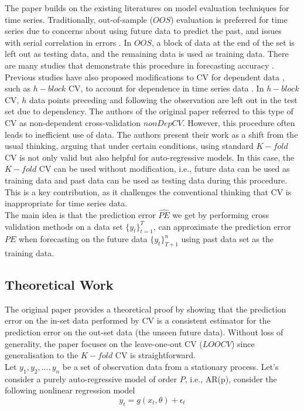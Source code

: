 \documentclass[12pt, oneside]{amsart}
\theoremstyle{definition}
\theoremstyle{remark}
\numberwithin{equation}{section}
\begin{document}
The paper builds on the existing literatures on model evaluation techniques for time series. Traditionally, out-of-sample ($OOS$) evaluation is preferred for time series due to concerns about using future data to predict the past, and issues with serial correlation in errors \citep{Bergmeir2018}. In $OOS$, a block of data at the end of the set is left out as testing data, and the remaining data is used as training data. There are many studies that demonstrate this procedure in forecasting accuracy \citep{Tashman}. Previous studies have also proposed modifications to CV for dependent data \citep{Gyorfi, Burman1992, Burman1994}, such as $h-block$ CV, to account for dependence in time series data \citep{Burman1994}. In $h-block$ CV, $h$ data points preceding and following the observation are left out in the test set due to dependency. The authors of the original paper \citep{Bergmeir2018} referred to this type of CV as non-dependent cross-validation $nonDepCV$. However, this procedure often leads to inefficient use of data. The authors present their work as a shift from the usual thinking, arguing that under certain conditions, using standard $K-fold$ CV is not only valid but also helpful for auto-regressive models. In this case, the $K-fold$ CV can be used without modification, i.e., future data can be used as training data and past data can be used as testing data during this procedure. This is a key contribution, as it challenges the conventional thinking that CV is inappropriate for time series data. 
\\

The main idea is that the prediction error $\hat{PE}$ we get by performing cross validation methods on a data set $\{y_t\}_{t=1}^T$, can approximate the prediction error $PE$ when forecasting on the future data $\{y_t\}_{T+1}^n$ using past data set as the training data.  

\subsection{Theoretical Work}
The original paper provides a theoretical proof by showing that the prediction error on the in-set data performed by CV is a consistent estimator for the prediction error on the out-set data (the unseen future data). Without loss of generality, the paper focuses on the leave-one-out CV ($LOOCV$) since generalisation to the $K-fold$ CV is straightforward.
\\

Let $y_1, y_2, ..., y_n$ be a set of observation data from a stationary process. Let's consider a purely auto-regressive model of order $P$, i.e., AR(p), consider the following nonlinear regression model
\begin{equation}\label{eq1}
y_t = g(x_t, \theta) + \epsilon_t
\end{equation}
\end{document}
